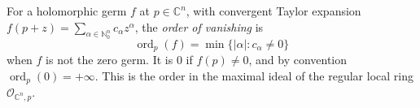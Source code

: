 
For a holomorphic germ $f$ at $p\in\mathbb C^n$, with convergent Taylor expansion $f(p+z)=\sum_{\alpha\in\mathbb N_0^n}c_\alpha z^\alpha$, the \emph{order of vanishing} is
\[
\operatorname{ord}_p(f)=\min\{|\alpha|:c_\alpha\ne0\}
\]
when $f$ is not the zero germ. It is $0$ if $f(p)\ne0$, and by convention $\operatorname{ord}_p(0)=+\infty$. This is the order in the maximal ideal of the regular local ring $\mathcal O_{\mathbb C^n,p}$.
